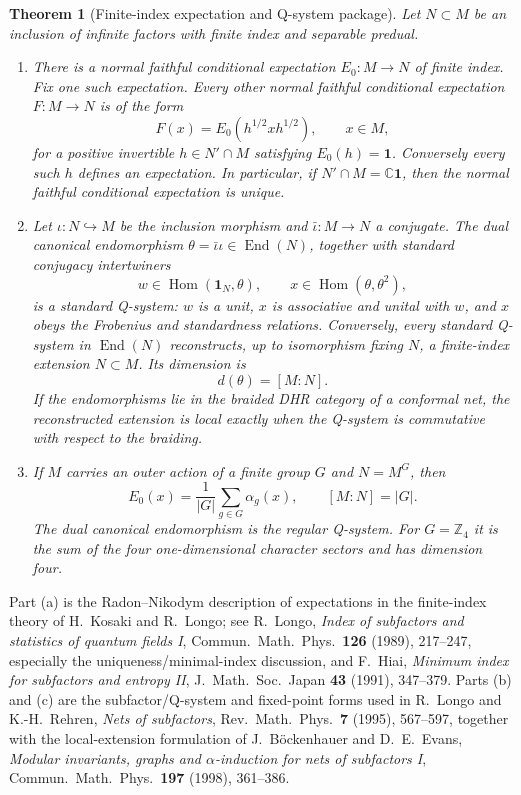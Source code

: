 \documentclass[11pt]{article}
\newtheorem{theorem}{Theorem}[section]
\theoremstyle{remark}
\newcommand{\C}{\mathbb C}
\newcommand{\Z}{\mathbb Z}
\newcommand{\id}{\mathbf 1}
\newcommand{\Hom}{\operatorname{Hom}}
\begin{document}
\begin{theorem}[Finite-index expectation and Q-system package]
\label{thm:qsystem}
Let $N\subset M$ be an inclusion of infinite factors with finite
index and separable predual.
\begin{enumerate}[label=\textup{(\alph*)}]
\item There is a normal faithful conditional expectation
  $E_0:M\to N$ of finite index.  Fix one such expectation.  Every
  other normal faithful conditional expectation $F:M\to N$ is of
  the form
  \[
    F(x)=E_0(h^{1/2}xh^{1/2}),\qquad x\in M,
  \tag{2.4}\label{eq:rn-expectation}
  \]
  for a positive invertible $h\in N'\cap M$ satisfying
  $E_0(h)=\id$.  Conversely every such $h$ defines an expectation.
  In particular, if $N'\cap M=\C\id$, then the normal faithful
  conditional expectation is unique.
\item Let $\iota:N\hookrightarrow M$ be the inclusion morphism and
  $\bar\iota:M\to N$ a conjugate.  The dual canonical endomorphism
  $\theta=\bar\iota\iota\in\operatorname{End}(N)$, together with
  standard conjugacy intertwiners
  \[
    w\in\Hom(\id_N,\theta),\qquad
    x\in\Hom(\theta,\theta^2),
  \]
  is a standard Q-system: $w$ is a unit, $x$ is associative and
  unital with $w$, and $x$ obeys the Frobenius and standardness
  relations.  Conversely, every standard Q-system in
  $\operatorname{End}(N)$ reconstructs, up to isomorphism fixing
  $N$, a finite-index extension $N\subset M$.  Its dimension is
  \[
    d(\theta)=[M:N].
  \tag{2.5}\label{eq:q-index}
  \]
  If the endomorphisms lie in the braided DHR category of a
  conformal net, the reconstructed extension is local exactly when
  the Q-system is commutative with respect to the braiding.
\item If $M$ carries an outer action of a finite group $G$ and
  $N=M^G$, then
  \[
    E_0(x)=\frac1{|G|}\sum_{g\in G}\alpha_g(x),\qquad
    [M:N]=|G|.
  \tag{2.6}\label{eq:group-average}
  \]
  The dual canonical endomorphism is the regular Q-system.  For
  $G=\Z_4$ it is the sum of the four one-dimensional character
  sectors and has dimension four.
\end{enumerate}
\end{theorem}

Part (a) is the Radon--Nikodym description of expectations in the
finite-index theory of H.~Kosaki and R.~Longo; see R.~Longo,
\emph{Index of subfactors and statistics of quantum fields I},
Commun.\ Math.\ Phys.\ \textbf{126} (1989), 217--247, especially
the uniqueness/minimal-index discussion, and
F.~Hiai, \emph{Minimum index for subfactors and entropy II},
J.\ Math.\ Soc.\ Japan \textbf{43} (1991), 347--379.  Parts (b) and
(c) are the subfactor/Q-system and fixed-point forms used in
R.~Longo and K.-H.~Rehren, \emph{Nets of subfactors},
Rev.\ Math.\ Phys.\ \textbf{7} (1995), 567--597, together with the
local-extension formulation of J.~B\"ockenhauer and D.~E.~Evans,
\emph{Modular invariants, graphs and $\alpha$-induction for nets of
subfactors I}, Commun.\ Math.\ Phys.\ \textbf{197} (1998), 361--386.
\end{document}
